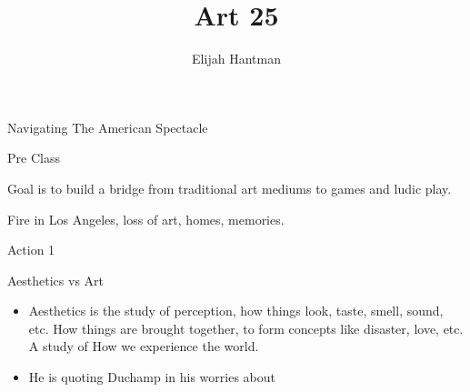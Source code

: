 \documentclass{report}
\title{\Huge{Art 25}}
\author{\huge{Elijah Hantman}}
\date{}
\begin{document}
\maketitle
\newpage

{\huge Navigating The American Spectacle}

\begin{description}
    \item {\large Pre Class}
        \begin{mdframed}
            Goal is to build a bridge from traditional art mediums
            to games and ludic play.
            \begin{center}
            \end{center}
        \end{mdframed}
        \begin{mdframed}
            Fire in Los Angeles, loss of art, homes,
            memories. 
        \end{mdframed}
    \item {\large Action 1}
        \begin{mdframed}
            Aesthetics vs Art
            \begin{itemize}
                \item Aesthetics is the study of perception,
                    how things look, taste, smell, sound, etc.
                    How things are brought together, to form
                    concepts like disaster, love, etc. A study
                    of How we experience the world.
            \end{itemize}
        \end{mdframed}
        \begin{center}
        \end{center}
        \begin{itemize}
            \item He is quoting Duchamp in his worries about

\end{itemize}
\end{description}
\end{document}
